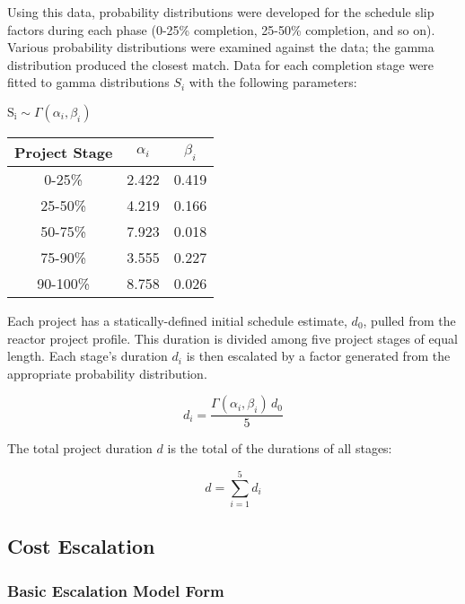 \documentclass{article}
\begin{document}
Using this data, probability distributions were developed for the schedule slip factors during each phase (0-25\% completion, 25-50\% completion, and so on).
Various probability distributions were examined against the data; the gamma distribution produced the closest match.
Data for each completion stage were fitted to gamma distributions $S_i$ with the following parameters:

\begin{center}
$\mathrm{S_i} \sim \Gamma \left( \alpha_i, \beta_i \right)$\\
\begin{tabular} {| c | c | c |} \hline
  Project Stage & $\alpha_i$ & $\beta_i$ \\ \hline
  0-25\% & 2.422 & 0.419 \\ \hline
  25-50\% & 4.219 & 0.166 \\ \hline
  50-75\% & 7.923 & 0.018 \\ \hline
  75-90\% & 3.555 & 0.227 \\ \hline
  90-100\% & 8.758 & 0.026 \\ \hline
\end{tabular}
\end{center}

Each project has a statically-defined initial schedule estimate, $d_0$, pulled from the reactor project profile.
This duration is divided among five project stages of equal length.
Each stage's duration $d_i$ is then escalated by a factor generated from the appropriate probability distribution.

\begin{equation}
  d_i = \frac{\Gamma \left( \alpha_i, \beta_i \right) \, d_0}{5}
\end{equation}

The total project duration $d$ is the total of the durations of all stages:

\begin{equation}
  d = \sum_{i=1}^5 d_i
\end{equation}

\subsection{Cost Escalation}

\subsubsection{Basic Escalation Model Form}
\end{document}
